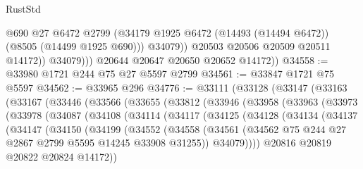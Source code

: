 \begin{lexlean}{RustStd}
\begin{coremodule}
                      @690
                      @27
                      @6472
                      @2799
                      (@34179 @1925 @6472 (@14493 (@14494 @6472)) (@8505 (@14499 @1925 @690)))
                      @34079))
                  @20503
                  @20506
                  @20509
                  @20511
                  @14172))
              @34079)))
        @20644
        @20647
        @20650
        @20652
        @14172))
@34558 := @33980 @1721 @244 @75 @27 @5597 @2799
@34561 := @33847 @1721 @75 @5597
@34562 := @33965 @296
@34776 := @33111
    (@33128
      (@33147
        (@33163
          (@33167
            (@33446
              (@33566
                (@33655
                  (@33812
                    (@33946
                      (@33958
                        (@33963
                          (@33973
                            (@33978
                              (@34087
                                (@34108
                                  (@34114
                                    (@34117
                                      (@34125
                                        (@34128
                                          (@34134
                                            (@34137
                                              (@34147
                                                (@34150
                                                  (@34199
                                                    (@34552
                                                      (@34558
                                                        (@34561
                                                          (@34562
                                                            @75
                                                            @244
                                                            @27
                                                            @2867
                                                            @2799
                                                            @5595
                                                            @14245
                                                            @33908
                                                            @31255))
                                                        @34079))))
                                                @20816
                                                @20819
                                                @20822
                                                @20824
                                                @14172))

\end{coremodule}
\end{lexlean}
